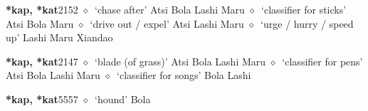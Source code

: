   \begin{list}{}{\leftmargin=1.5em \itemindent=-1.5em}
  \item {\footnotesize \textbf{*kap, *kat}}{\tiny 2152}
         $\diamond$~`chase after'
         Atsi 
\hspace{1ex}
         Bola 
\hspace{1ex}
         Lashi 
\hspace{1ex}
         Maru 
\hspace{1ex}
         $\diamond$~`classifier for sticks'
         Atsi 
\hspace{1ex}
         Bola 
\hspace{1ex}
         Maru 
\hspace{1ex}
         $\diamond$~`drive out / expel'
         Atsi 
\hspace{1ex}
         Lashi 
\hspace{1ex}
         Maru 
\hspace{1ex}
         $\diamond$~`urge / hurry / speed up'
         Lashi 
\hspace{1ex}
         Maru 
\hspace{1ex}
         Xiandao 
  \item {\footnotesize \textbf{*kap, *kat}}{\tiny 2147}
\hspace{1ex}
         $\diamond$~`blade (of grass)'
         Atsi 
\hspace{1ex}
         Bola 
\hspace{1ex}
         Lashi 
\hspace{1ex}
         Maru 
\hspace{1ex}
         $\diamond$~`classifier for pens'
         Atsi 
\hspace{1ex}
         Bola 
\hspace{1ex}
         Lashi 
\hspace{1ex}
         Maru 
\hspace{1ex}
         $\diamond$~`classifier for songs'
         Bola 
\hspace{1ex}
         Lashi 
  \item {\footnotesize \textbf{*kap, *kat}}{\tiny 5557}
\hspace{1ex}
         $\diamond$~`hound'
         Bola 
  \end{list}
